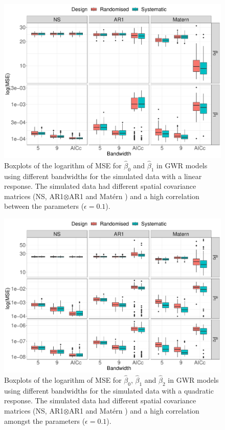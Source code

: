 \documentclass[a4paper]{article} 	%
\newcommand{\Matern}{Mat\'ern }
\begin{document}
\begin{figure}[!htp]
	\centering
	\includegraphics[width=\linewidth]{Expt/Col_LinCombMSE_newpar_eta01.pdf}
	\caption{Boxplots of the logarithm of MSE for $\hat{\beta}_0$ and $\hat{\beta}_1$ in GWR models using different bandwidths for the simulated data with a linear response. The simulated data had different spatial covariance matrices (NS, AR1$\otimes$AR1 and \Matern) and a high correlation between the parameters ($\epsilon=0.1$).}\label{fig:LinBetaMSEeta01}
\end{figure}


\begin{figure}[!htp]
	\centering
	\includegraphics[width=\linewidth]{Expt/Col_QuaCombMSE_newpar_eta01.pdf}
	\caption{Boxplots of the logarithm of MSE for $\hat{\beta}_0$, $\hat{\beta}_1$ and $\hat{\beta}_2$ in GWR models using different bandwidths for the simulated data with a quadratic response. The simulated data had different spatial covariance matrices (NS, AR1$\otimes$AR1 and \Matern) and a high correlation amongst the parameters ($\epsilon=0.1$).} \label{fig:QuadBetaMSEeta01}
\end{figure}





\renewcommand\bibname{References}%
\printbibliography
\end{document}
